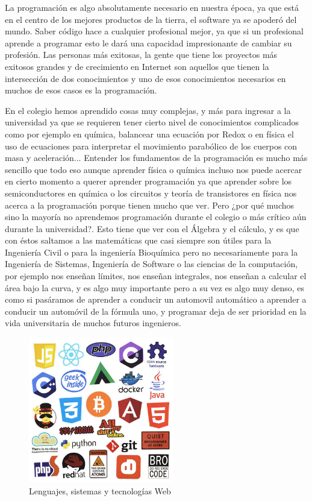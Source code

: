 \documentclass[twocolumns,a4paper]{IEEEtran}
\begin{document}
La programación es algo absolutamente necesario en nuestra época, ya que está
en el centro de los mejores productos de la tierra, el software ya se apoderó
del mundo. Saber código hace a cualquier profesional mejor, ya que si un
profesional aprende a programar esto le dará una capacidad impresionante de
cambiar su profesión. Las personas más exitosas, la gente que tiene los
proyectos más exitosos grandes y de crecimiento en Internet son aquellos que
tienen la intersección de dos conocimientos y uno de esos conocimientos
necesarios en muchos de esos casos es la programación.

En el colegio hemos aprendido cosas muy complejas, y más para ingresar a la
universidad ya que se requieren tener cierto nivel de conocimientos complicados
como por ejemplo en química, balancear una ecuación por Redox o en física el
uso de ecuaciones para interpretar el movimiento parabólico de los cuerpos con
masa y aceleración... Entender los fundamentos de la programación es mucho más
sencillo que todo eso aunque aprender física o química incluso nos puede
acercar en cierto momento a querer aprender programación ya que aprender sobre
los semiconductores en química o los circuitos y teoría de transistores en
física nos acerca a la programación porque tienen mucho que ver. Pero ¿por qué
muchos sino la mayoría no aprendemos programación durante el colegio o más
crítico aún durante la universidad?. Esto tiene que ver con el Álgebra y el
cálculo, y es que con éstos saltamos a las matemáticas que casi siempre son
útiles para la Ingeniería Civil o para la ingeniería Bioquímica pero no
necesariamente para la Ingeniería de Sistemas, Ingeniería de Software o las
ciencias de la computación, por ejemplo nos enseñan límites, nos enseñan
integrales, nos enseñan a calcular el área bajo la curva, y es algo muy
importante pero a su vez es algo muy denso, es como si pasáramos de aprender a
conducir un automovil automático a aprender a conducir un automóvil de la
fórmula uno, y programar deja de ser prioridad en la vida universitaria de
muchos futuros ingenieros.

\begin{figure}[t!]
   \centering
   \includegraphics[width=2.5in]{tec_web}
   \caption{Lenguajes, sistemas y tecnologías Web}
   \label{fig:tecnologia_web}
\end{figure}
\end{document}
